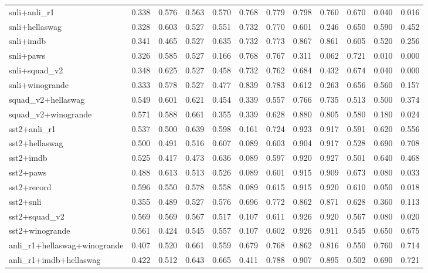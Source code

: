 \begin{table}[t]
\begin{tabular}{lrrrrrrrrrrr}
    snli+anli\_r1 & 0.338 & 0.576 & 0.563 & 0.570 & 0.768 & 0.779 & 0.798 & 0.760 & 0.670 & 0.040 & 0.016 \\
    snli+hellaswag & 0.328 & 0.603 & 0.527 & 0.551 & 0.732 & 0.770 & 0.601 & 0.246 & 0.650 & 0.590 & 0.452 \\
    snli+imdb & 0.341 & 0.465 & 0.527 & 0.635 & 0.732 & 0.773 & 0.867 & 0.861 & 0.605 & 0.520 & 0.256 \\
    snli+paws & 0.326 & 0.585 & 0.527 & 0.166 & 0.768 & 0.767 & 0.311 & 0.062 & 0.721 & 0.010 & 0.000 \\
    snli+squad\_v2 & 0.348 & 0.625 & 0.527 & 0.458 & 0.732 & 0.762 & 0.684 & 0.432 & 0.674 & 0.040 & 0.000 \\
    snli+winogrande & 0.333 & 0.578 & 0.527 & 0.477 & 0.839 & 0.783 & 0.612 & 0.263 & 0.656 & 0.560 & 0.157 \\
    squad\_v2+hellaswag & 0.549 & 0.601 & 0.621 & 0.454 & 0.339 & 0.557 & 0.766 & 0.735 & 0.513 & 0.500 & 0.374 \\
    squad\_v2+winogrande & 0.571 & 0.588 & 0.661 & 0.355 & 0.339 & 0.628 & 0.880 & 0.805 & 0.580 & 0.180 & 0.024 \\
    sst2+anli\_r1 & 0.537 & 0.500 & 0.639 & 0.598 & 0.161 & 0.724 & 0.923 & 0.917 & 0.591 & 0.620 & 0.556 \\
    sst2+hellaswag & 0.500 & 0.491 & 0.516 & 0.607 & 0.089 & 0.603 & 0.904 & 0.917 & 0.528 & 0.690 & 0.708 \\
    sst2+imdb & 0.525 & 0.417 & 0.473 & 0.636 & 0.089 & 0.597 & 0.920 & 0.927 & 0.501 & 0.640 & 0.468 \\
    sst2+paws & 0.488 & 0.613 & 0.513 & 0.526 & 0.089 & 0.601 & 0.915 & 0.909 & 0.673 & 0.080 & 0.033 \\
    sst2+record & 0.596 & 0.550 & 0.578 & 0.558 & 0.089 & 0.615 & 0.915 & 0.920 & 0.610 & 0.050 & 0.018 \\
    sst2+snli & 0.355 & 0.489 & 0.527 & 0.576 & 0.696 & 0.772 & 0.862 & 0.871 & 0.628 & 0.360 & 0.113 \\
    sst2+squad\_v2 & 0.569 & 0.569 & 0.567 & 0.517 & 0.107 & 0.611 & 0.926 & 0.920 & 0.567 & 0.080 & 0.020 \\
    sst2+winogrande & 0.561 & 0.424 & 0.545 & 0.557 & 0.107 & 0.602 & 0.926 & 0.911 & 0.545 & 0.650 & 0.675 \\
    \addlinespace
    anli\_r1+hellaswag+winogrande & 0.407 & 0.520 & 0.661 & 0.559 & 0.679 & 0.768 & 0.862 & 0.816 & 0.550 & 0.760 & 0.714 \\
    anli\_r1+imdb+hellaswag & 0.422 & 0.512 & 0.643 & 0.665 & 0.411 & 0.788 & 0.907 & 0.895 & 0.502 & 0.690 & 0.721 \\

\end{tabular}
\end{table}
